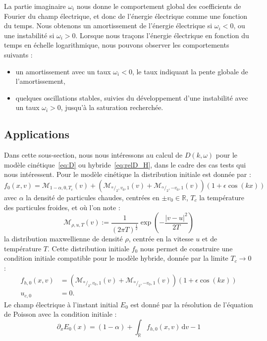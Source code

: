 La partie imaginaire $\omega_i$ nous donne le comportement global des coefficients de Fourier du champ électrique, et donc de l'énergie électrique comme une fonction du temps. Nous obtenons un amortissement de l'énergie électrique si $\omega_i < 0$, ou une instabilité si $\omega_i >0$. Lorsque nous traçons l'énergie électrique en fonction du temps en échelle logarithmique, nous pouvons observer les comportements suivants :
\begin{itemize}
  \item un amortissement avec un taux $\omega_i<0$, le taux indiquant la pente globale de l'amortissement,
  \item quelques oscillations stables, suivies du développement d'une instabilité avec un taux $\omega_i>0$, jusqu'à la saturation recherchée.
\end{itemize}

\subsection{Applications}\label{ssec:disp_appl}

Dans cette sous-section, nous nous intéressons au calcul de $D(k,\omega)$ pour le modèle cinétique~\eqref{eq:D} ou hybride~\eqref{eq:relD_H}, dans le cadre des cas tests qui nous intéressent. Pour le modèle cinétique la distribution initiale est donnée par :
$$
  f_0(x,v) = \mathcal{M}_{1-\alpha,0,T_c}(v)
    + \left(
      \mathcal{M}_{^\alpha/_2,v_0,1}(v) + \mathcal{M}_{^\alpha/_2,-v_0,1}(v)
    \right)(1+\epsilon\cos(kx))
$$
avec $\alpha$ la densité de particules chaudes, centrées en $\pm v_0\in\mathbb{R}$, $T_c$ la température des particules froides, et où l'on note :
$$
  \mathcal{M}_{\rho,u,T}(v) := \frac{1}{(2\pi T)^\frac{1}{2}}\exp\left(-\frac{|v-u|^2}{2T}\right)
$$
la distribution maxwellienne de densité $\rho$, centrée en la vitesse $u$ et de température $T$. Cette distribution initiale $f_0$ nous permet de construire une condition initiale compatible pour le modèle hybride, donnée par la limite $T_c\to 0$ :
\begin{equation}
  \begin{aligned}
    f_{h,0} (x,v) & = \left(
      \mathcal{M}_{^\alpha/_2,v_0,1}(v) + \mathcal{M}_{^\alpha/_2,-v_0,1}(v)
    \right)(1+\epsilon\cos(kx)) \\
    u_{c,0} & = 0.
  \end{aligned}
\label{eq:f0hdexv}\end{equation}
Le champ électrique à l'instant initial $E_0$ est donné par la résolution de l'équation de Poisson avec la condition initiale :
$$
  \partial_x E_0(x) = (1-\alpha) + \int_\mathbb{R}f_{h,0}(x,v)\,\mathrm{d}v - 1
$$

